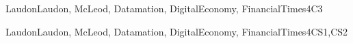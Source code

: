 \begin{syllabus}
\begin{unit}{\SPProfessionalEthics}{}{LaudonLaudon, McLeod, Datamation, DigitalEconomy, FinancialTimes}{4}{C3}
\begin{learningoutcomes}
        \item \SPProfessionalEthicsLOInvestigateForms [\Usage]
        \item \SPProfessionalEthicsLOExamine [\Usage]
        \item \SPProfessionalEthicsLOExplainTheErgonomics [\Usage]
        \item \SPProfessionalEthicsLODevelopA [\Familiarity]
        \item \SPProfessionalEthicsLODescribeIssuesIndustries [\Usage]
	\end{learningoutcomes}
\end{unit}

\begin{unit}{\SPIntellectualProperty}{}{LaudonLaudon, McLeod, Datamation, DigitalEconomy, FinancialTimes}{4}{CS1,CS2}
	\begin{topics}
        \item \SPIntellectualPropertyTopicPhilosophical
        \item \SPIntellectualPropertyTopicIntellectual
        \item \SPIntellectualPropertyTopicIntangible
        \item \SPIntellectualPropertyTopicLegal
        \item \SPIntellectualPropertyTopicDigital
        \item \SPIntellectualPropertyTopicCopyrights
        \item \SPIntellectualPropertyTopicPlagiarism
        \item \SPIntellectualPropertyTopicFoundations
        \item \SPIntellectualPropertyTopicSoftware
	\end{topics}


\end{unit}
\end{syllabus}
